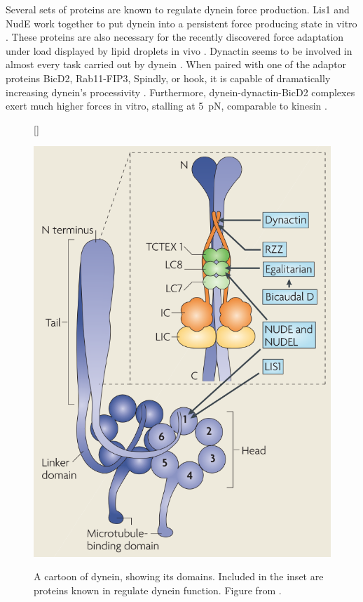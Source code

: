 Several sets of proteins are known to regulate dynein force production. Lis1 and NudE work together to put dynein into a persistent force producing state in vitro \cite{McKenney2010}. These proteins are also necessary for the recently discovered force adaptation under load displayed by lipid droplets in vivo \cite{Reddy2016}. Dynactin seems to be involved in almost every task carried out by dynein \cite{Cianfrocco2015}. When paired with one of the adaptor proteins BicD2, Rab11-FIP3, Spindly, or hook, it is capable of dramatically increasing dynein's processivity \cite{McKenney2014}. Furthermore, dynein-dynactin-BicD2 complexes exert much higher forces in vitro, stalling at \SI{5}{\pico\newton}, comparable to kinesin \cite{Belyy2016}.

\begin{figure}
[\FBwidth]
{\caption[Dynein and its regulators]{A cartoon of dynein, showing its domains. Included in the inset are proteins known in regulate dynein function. Figure from \cite{Kardon2009}.
\label{fig:dynein}}}
{\includegraphics[scale=.5]{background/dynein_interactors}}
\end{figure}

